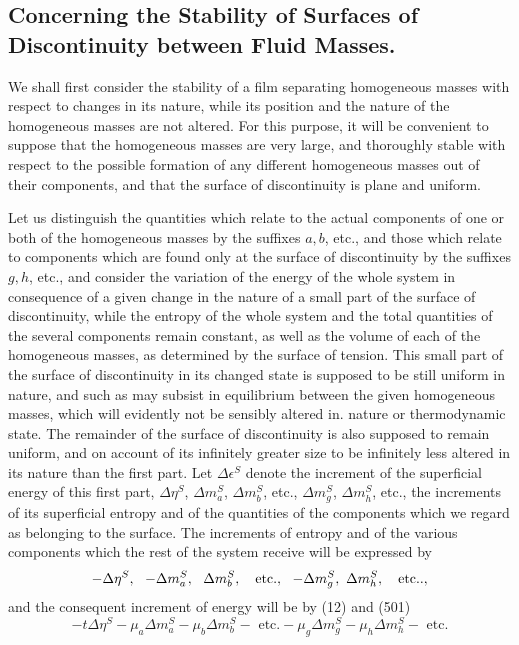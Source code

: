 \documentclass[12pt]{memoir}
\begin{document}
{\subsection{Concerning the Stability of Surfaces of Discontinuity between Fluid Masses.}
We shall first consider the stability of a film separating homogeneous masses with respect to changes in its nature, while its position and the nature of the homogeneous masses are not altered. For this purpose, it will be convenient to suppose that the homogeneous masses are very large, and thoroughly stable with respect to the possible formation of any different homogeneous masses out of their components, and that the surface of discontinuity is plane and uniform.

Let us distinguish the quantities which relate to the actual components of one or both of the homogeneous masses by the suffixes $a, b$, etc., and those which relate to components which are found only at the surface of discontinuity by the suffixes $g,h$,  etc., and consider the variation of the energy of the whole system in consequence of a given change in the nature of a small part of the surface of discontinuity, while the entropy of the whole system and the total quantities of the several components remain constant, as well as the volume of each of the homogeneous masses, as determined by the surface of tension. This small part of the surface of discontinuity in its changed state is supposed to be still uniform    in nature, and such as may subsist in equilibrium between the given homogeneous masses, which will evidently not be sensibly altered in. nature or thermodynamic state. The remainder of the surface of discontinuity is also supposed to remain uniform, and on account of its infinitely greater size to be infinitely less altered in its nature than the first part. Let $\Delta \epsilon^S$ denote the increment of the superficial energy of this first part, $\Delta \eta^S$, $\Delta m_a^S$, $\Delta m_b^S$, etc., $\Delta m_g^S$, $\Delta m_h^S$, etc., the increments of its superficial entropy and of the quantities of the components which we regard as belonging to the surface. The increments of entropy and of the various components which the rest of the system receive will be expressed by
$$ -\Delta \eta^S, \ \ -\Delta m_a^S,\ \ \Delta m_b^S, \ \ \text{ etc.}, \ \ -\Delta m_g^S, \ \-\Delta m_h^S, \ \ \text{ etc.}.,$$
and the consequent increment of energy will be by (12) and (501)
$$- t \Delta \eta^S - \mu_a \Delta m_a^S - \mu_b \Delta m_b^S - \text{ etc.} -  \mu_g \Delta m_g^S - \mu_h \Delta m_h^S- \text{ etc.}$$
}
\end{document}
